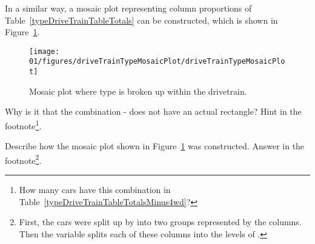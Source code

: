 In a similar way, a mosaic plot representing column proportions of Table~\ref{typeDriveTrainTableTotals} can be constructed, which is shown in Figure~\ref{driveTrainTypeMosaicPlot}.


\begin{figure}
   \centering
   \texttt{[image: 01/figures/driveTrainTypeMosaicPlot/driveTrainTypeMosaicPlot]}
   \caption{Mosaic plot where type is broken up within the drivetrain.}
   \label{driveTrainTypeMosaicPlot}
\end{figure}

\begin{exercise}
Why is it that the combination - does not have an actual rectangle? Hint in the footnote\footnote{How many cars have this combination in Table~\ref{typeDriveTrainTableTotalsMinus4wd}?}.
\end{exercise}

\begin{exercise}
Describe how the mosaic plot shown in Figure~\ref{driveTrainTypeMosaicPlot} was constructed. Answer in the footnote\footnote{First, the cars were split up by  into two groups represented by the columns. Then the  variable splits each of these columns into the levels of .}.
\end{exercise}





